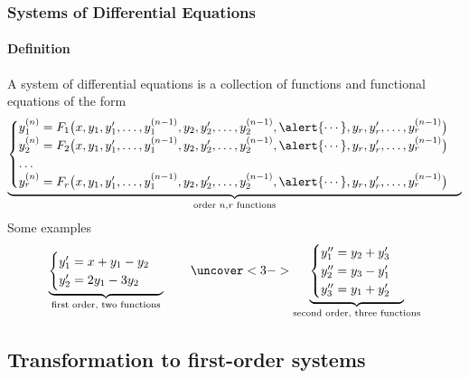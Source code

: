 \documentclass[9pt,xcolor=x11names,compress]{beamer}
\begin{document}
\begin{frame}\frametitle{Systems of Differential Equations}
    
\framesubtitle{Definition}
A system of differential equations is a collection of functions and functional equations of the form
\begin{equation*}
\underbrace{\begin{cases}
	y_1^{(n)} = F_1\big(x,y_1,y'_1,\dotsc,y_1^{(n-1)}, y_2,y'_2,\dotsc,y_2^{(n-1)},\alert{\dotsb},y_r,y'_r,\dotsc,y_r^{(n-1)}\big) \\
	y_2^{(n)} = F_2\big(x,y_1,y'_1,\dotsc,y_1^{(n-1)}, y_2,y'_2,\dotsc,y_2^{(n-1)},\alert{\dotsb},y_r,y'_r,\dotsc,y_r^{(n-1)}\big) \\
	\dotsc\\
	y_r^{(n)} = F_r\big(x,y_1,y'_1,\dotsc,y_1^{(n-1)}, y_2,y'_2,\dotsc,y_2^{(n-1)},\alert{\dotsb},y_r,y'_r,\dotsc,y_r^{(n-1)}\big)
\end{cases}}_{\text{order }n, r\text{ functions}}
\end{equation*}
\pause Some examples
\begin{equation*}
	\underbrace{\begin{cases}
		y'_1=x+y_1-y_2 \\
		y'_2=2y_1-3y_2
	\end{cases}}_{\text{first order, two functions}}\qquad
	\uncover<3->{\underbrace{
	\begin{cases}
		y''_1=y_2+y'_3 \\
		y''_2=y_3-y'_1 \\
		y''_3=y_1+y'_2
	\end{cases}}_{\text{second order, three functions}}}
\end{equation*}
\end{frame}

\subsection{Transformation to first-order systems}
\end{document}
